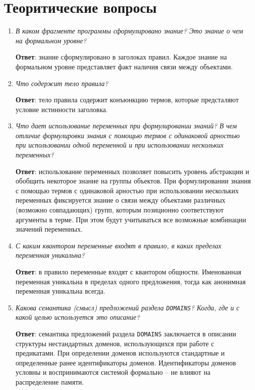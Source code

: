{\large\section*{Теоритические вопросы}}

\begin{enumerate}
	\item \textit{В каком фрагменте программы сформулировано знание? Это знание о чем на формальном уровне?}

	\qquad \textbf{Ответ}: знание сформулировано в заголоках правил. Каждое знание на формальном уровне представляет факт наличия связи между объектами. 

	\item \textit{Что содержит тело правила?}

	\qquad \textbf{Ответ}: тело правила содержит конъюнкцию термов, которые предсталяют условие истинности заголовка.

	\item \textit{Что дает использование переменных при формулировании знаний? В чем отличие формулировки знания с помощью термов с одинаковой арностью при использовании одной переменной и при использовании нескольких переменных?}

	\qquad \textbf{Ответ}: использование переменных позволяет повысить уровень абстракции и обобщить некоторое знание на группы объектов. При формулировании знания с помощью термов с одинаковой арностью при использовании нескольких переменных фиксируется знание о связи между объектами различных (возможно совпадающих) групп, которым позиционно соответствуют аргументы в терме. При этом будут учитываться все возможные комбинации значений переменных. 

	\item \textit{С каким квантором переменные входят в правило, в каких пределах переменная уникальна?}

	\qquad \textbf{Ответ}: в правило переменные входят с квантором общности. Именованная переменная уникальна в пределах одного предложения, тогда как анонимная переменная уникальна всегда.

	\item \textit{Какова семантика (смысл) предложений раздела \texttt{DOMAINS}? Когда, где и с какой целью используется это описание?}

	\qquad \textbf{Ответ}: семантика предложений раздела \texttt{DOMAINS} заключается в описании структуры нестандартных доменов, использующихся при работе с предикатами. При определении доменов используются стандартные и определенные ранее идентификаторы доменов. Идентификаторы доменов условны и воспринимаются системой формально – не влияют на распределение памяти.


\end{enumerate}
